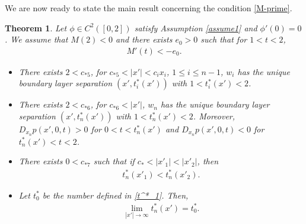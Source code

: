 \documentclass{amsart}
\newtheorem{theorem}[defn]{Theorem}
\numberwithin{equation}{section}
\begin{document}
We are now ready to state the main result concerning the condition \eqref{M-prime}.
\begin{theorem} \label{theorem260403}
Let $\phi \in C^2([0,2])$ satisfy Assumption \ref{assume1} and $ \phi'(0)  =0$. We assume that $M(2)  < 0$ and  there exists  $ e_0 > 0$   such  that for $ 1 < t < 2$, 
\begin{align}\label{260321-7}
M'(t) < -e_0.
\end{align}
\begin{itemize}
\item[(i)]
There exists $ 2 <  c_{*5}$, for  $c_{*5} < |x'| < c_i x_i $,  $ 1 \leq i \leq n-1$,   $ w_i$ has the unique boundary layer separation $ (x', t^*_i(x'))$ with $ 1 < t^*_i (x') <2$.

 

\item[(ii)] 
There exists $ 2 <  c_{*6}$, for  $c_{*6} < |x'| $,     $ w_n$ has the unique boundary layer separation $ (x', t^*_n(x'))$  with $ 1 < t^*_n (x') <2$. Moreover,  $D_{x_n} p(x',0,t) > 0$ for $ 0 < t< t_n^* (x')$ and $D_{x_n} p(x', 0,t) < 0$ for $ t_n^* (x') < t< 2$.

\item[(iii)]
There exists $ 0 < c_{*7}$ such that if $ c_* < |x'_1| < |x'_2|$, then
\begin{align*} 
  t_n^*(x'_1  ) < t_n^* (x'_2 ).
\end{align*}

 
\item[(iv)] Let $t_0^*$ be the number defined in \eqref{t^*_1}. Then,
\begin{align*}
\lim_{|x'| \rightarrow \infty} t_n^* (x') = t_0^*.
\end{align*}
\end{itemize}

\end{theorem}
\end{document}
